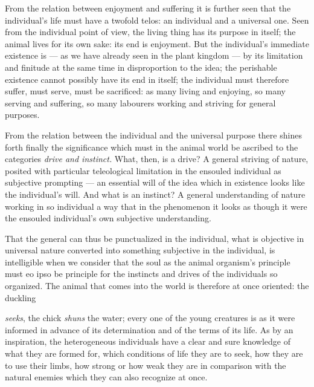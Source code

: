 \documentclass[12pt,a4paper]{book}
\begin{document}
From the relation between enjoyment and suffering it is further seen that the
individual's life must have a twofold telos: an individual and a universal one. Seen
from the individual point of view, the living thing has its purpose in itself; the
animal lives for its own sake: its end is enjoyment. But the individual's immediate
existence is --- as we have already seen in the plant kingdom --- by its limitation and
finitude at the same time in disproportion to the idea; the perishable existence cannot
possibly have its end in itself; the individual must therefore suffer, must serve, must
be sacrificed: as many living and enjoying, so many serving and suffering, so many
labourers working and striving for general purposes.

From the relation between the individual and the universal purpose there shines forth
finally the significance which must in the animal world be ascribed to the categories
\emph{drive and instinct.} What, then, is a drive? A general striving of nature,
posited with particular teleological limitation in the ensouled individual as
subjective prompting --- an essential will of the idea which in existence looks like
the individual's will. And what is an instinct? A general understanding of nature
working in so individual a way that in the phenomenon it looks as though it were the
ensouled individual's own subjective understanding.

That the general can thus be punctualized in the individual, what is objective in
universal nature converted into something subjective in the individual, is intelligible
when we consider that the soul as the animal organism's principle must eo ipso be
principle for the instincts and drives of the individuals so organized. The animal that
comes into the world is therefore at once oriented: the duckling

\setcounter{footnote}{0}
\emph{seeks}, the chick \emph{shuns} the water; every one of the young creatures is as
it were informed in advance of its determination and of the terms of its life. As by an
inspiration, the heterogeneous individuals have a clear and sure knowledge of what they
are formed for, which conditions of life they are to seek, how they are to use their
limbs, how strong or how weak they are in comparison with the natural enemies which
they can also recognize at once.
\end{document}
